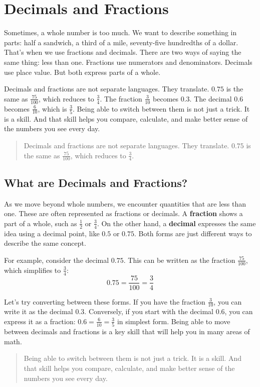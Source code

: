 \cleardoublepage

\section{Decimals and Fractions}

Sometimes, a whole number is too much. We want to describe something in parts:
half a sandwich, a third of a mile, seventy-five hundredths of a dollar. That's
when we use fractions and decimals. There are two ways of saying the same thing:
less than one. Fractions use numerators and denominators. Decimals use place
value. But both express parts of a whole.

Decimals and fractions are not separate languages. They translate. \(0.75\) is
the same as \(\frac{75}{100}\), which reduces to \(\frac{3}{4}\). The fraction
\(\frac{3}{10}\) becomes \(0.3\). The decimal \(0.6\) becomes \(\frac{6}{10}\),
which is \(\frac{3}{5}\). Being able to switch between them is not just a trick.
It is a skill. And that skill helps you compare, calculate, and make better
sense of the numbers you see every day.

\blockquote{Decimals and fractions are not 
separate languages. They translate.
\(0.75\) is the same as \(\frac{75}{100}\), which reduces to \(\frac{3}{4}\).}

\subsection{What are Decimals and Fractions?}

As we move beyond whole numbers, we encounter quantities that are less than one.
These are often represented as fractions or decimals. A \textbf{fraction} shows
a part of a whole, such as \(\frac{1}{2}\) or \(\frac{3}{4}\). On the other
hand, a \textbf{decimal} expresses the same idea using a decimal point, like
\(0.5\) or \(0.75\). Both forms are just different ways to describe the same
concept.

For example, consider the decimal \(0.75\). This can be written as the fraction
\(\frac{75}{100}\), which simplifies to \(\frac{3}{4}\):
\[
0.75 = \frac{75}{100} = \frac{3}{4}
\]

Let's try converting between these forms. If you have the fraction
\(\frac{3}{10}\), you can write it as the decimal \(0.3\). Conversely, if you
start with the decimal \(0.6\), you can express it as a fraction: \(0.6 =
\frac{6}{10} = \frac{3}{5}\) in simplest form. Being able to move between
decimals and fractions is a key skill that will help you in many areas of math.

\blockquote{Being able to switch between them is not just a trick. It is a
skill. And that skill helps you compare, calculate, and make better sense of the
numbers you see every day.}





% 
% 
% 